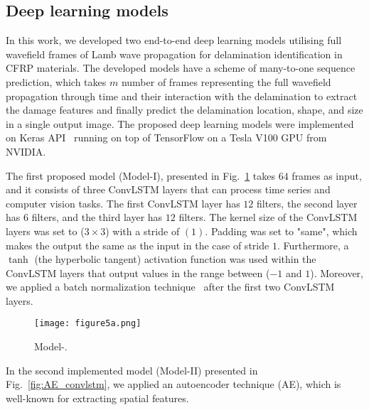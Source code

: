\subsection{Deep learning models}
\label{proposed_approach}
\begin{sloppypar}
	In this work, we developed two end-to-end deep learning models utilising full wavefield frames of Lamb wave propagation for delamination identification in CFRP materials.
	The developed models have a scheme of many-to-one sequence prediction, which takes \(m\) number of frames representing the full wavefield propagation through time and their interaction with the delamination to extract the damage features and finally predict the delamination location, shape, and size in a single output image.
	The proposed deep learning models were implemented on Keras API~\cite{chollet2015keras} running on top of TensorFlow on a Tesla V100 GPU from NVIDIA.
	
	The first proposed model (Model-I), presented in Fig.~\ref{fig:convlstm_model} takes \(64\) frames as input, and it consists of three ConvLSTM layers that can process time series and computer vision tasks.
	The first ConvLSTM layer has \(12\) filters, the second layer has \(6\) filters, and the third layer has \(12\) filters.
	The kernel size of the ConvLSTM layers was set to (\(3\times3\)) with a stride of \((1)\). 
	Padding was set to "same", which makes the output the same as the input in the case of stride \(1\).
	Furthermore, a \(\tanh\) (the hyperbolic tangent) activation function was used within the ConvLSTM layers that output values in the range between (\(-1\) and \(1\)).
	Moreover, we applied a batch normalization technique~\cite{Santurkar2018} after the first two ConvLSTM layers.
	\begin{figure} [!ht]
		\centering
			\centering
			\texttt{[image: figure5a.png]}
			\caption{Model-.} %
			\label{fig:convlstm_model}
	\end{figure}

	In the second implemented model (Model-II) presented in Fig.~\ref{fig:AE_convlstm}, we applied an autoencoder technique (AE), which is well-known for extracting spatial features.
	

\end{sloppypar}

